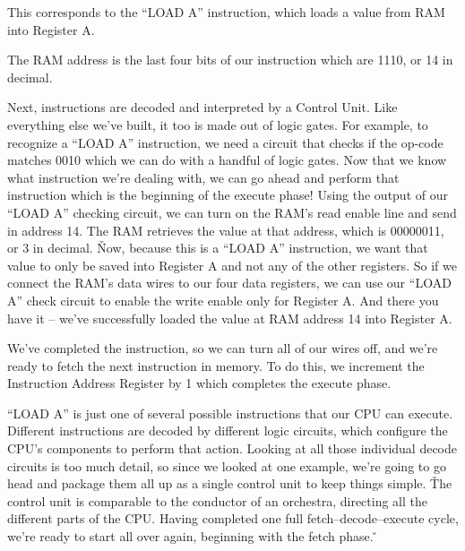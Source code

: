 
This corresponds to the ``LOAD A'' instruction, which loads a value from RAM into Register A\@.


The RAM address is the last four bits of our instruction which are 1110, or 14 in decimal.


Next, instructions are decoded and interpreted by a Control Unit. Like everything else we've built, it too is made
out of logic gates. For example, to recognize a ``LOAD A'' instruction, we need a circuit that checks if the op-code
matches 0010 which we can do with a handful of logic gates. Now that we know what instruction we're dealing with, we
can go ahead and perform that instruction which is the beginning of the execute phase! Using the output of our ``LOAD
A'' checking circuit, we can turn on the RAM's read enable line and send in address 14. The RAM retrieves the value
at that address, which is 00000011, or 3 in decimal. \v

Now, because this is a ``LOAD A'' instruction, we want that value to only be saved into Register A and not any of the
other registers. So if we connect the RAM's data wires to our four data registers, we can use our ``LOAD A'' check
circuit to enable the write enable only for Register A. And there you have it -- we've successfully loaded the value
at RAM address 14 into Register A\@.


We've completed the instruction, so we can turn all of our wires off, and we're ready to fetch the next instruction
in memory. To do this, we increment the Instruction Address Register by 1 which completes the execute phase.


``LOAD A'' is just one of several possible instructions that our CPU can execute. Different instructions are decoded
by different logic circuits, which configure the CPU's components to perform that action. Looking at all those
individual decode circuits is too much detail, so since we looked at one example, we're going to go head and package
them all up as a single control unit to keep things simple. \v

The control unit is comparable to the conductor of an orchestra, directing all the different parts of the CPU\@.
Having completed one full fetch–decode–execute cycle, we're ready to start all over again, beginning with the fetch
phase. \v

